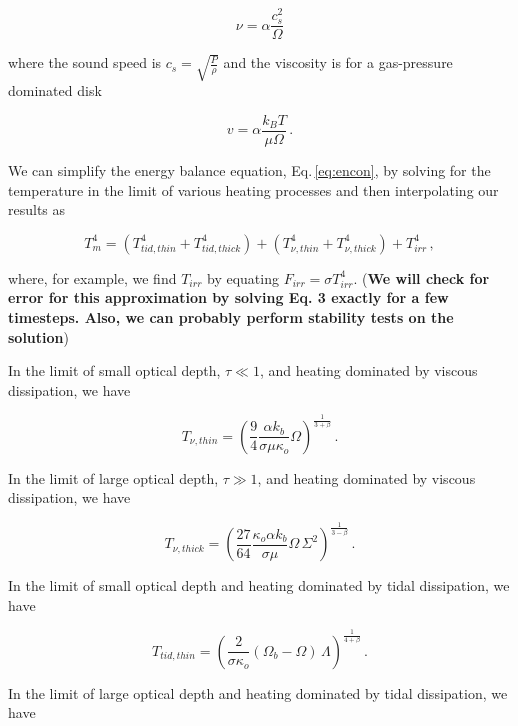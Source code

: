 \documentclass{article}
\begin{document}
\begin{equation}
\nu = \alpha \frac{c_s^2}{\Omega}
\end{equation}

where the sound speed is $c_s = \sqrt{\frac{P}{\rho}}$ and the viscosity is for a gas-pressure dominated disk 
 
\begin{equation}
v = 	\alpha \frac{k_B T}{\mu \Omega}\,.
\end{equation}

We can simplify the energy balance equation, Eq.\,\ref{eq:encon}, by solving for the temperature in the limit of various heating processes and then interpolating our results as

\begin{equation}
T_m^4 = \left(T_{tid,thin}^4 + T_{tid, thick}^4\right)  + \left(T_{\nu,thin}^4 + T_{\nu,thick}^4\right) + T_{irr}^4\,,
\end{equation}

where, for example, we find $T_{irr}$ by equating $F_{irr} = \sigma T_{irr}^4$. (\textbf{We will check for error for this approximation by solving Eq. 3 exactly for a few timesteps. Also, we can probably perform stability tests on the solution})

In the limit of small optical depth, $\tau \ll 1$, and heating dominated by viscous dissipation, we have

\begin{equation}
T _{\nu,thin} = \left(\frac{9}{4} \frac{\alpha k_b}{\sigma \mu \kappa_o}\Omega \right)^\frac{1}{3+\beta}\,.
\end{equation}

In the limit of large optical depth, $\tau \gg 1$, and heating dominated by viscous dissipation, we have

\begin{equation}
T_{\nu,thick}= \left(\frac{27}{64} \frac{\kappa_o \alpha k_b}{\sigma \mu} \Omega\,\Sigma^2\right)^\frac{1}{3-\beta}\,.
\end{equation}

In the limit of small optical depth and heating dominated by tidal dissipation, we have

\begin{equation}
T_{tid,thin} = \left(\frac{2}{\sigma \kappa_o}(\Omega_b - \Omega)\, \Lambda \right)^\frac{1}{4+\beta}\,.
\end{equation}

In the limit of large optical depth and heating dominated by tidal dissipation, we have
\end{document}
